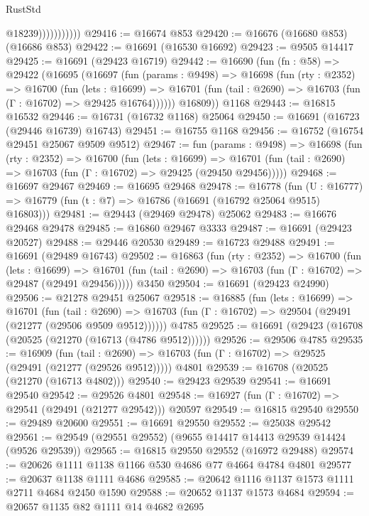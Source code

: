 \begin{lexlean}{RustStd}
\begin{coremodule}
                          @18239)))))))))))
@29416 := @16674 @853
@29420 := @16676 (@16680 @853) (@16686 @853)
@29422 := @16691 (@16530 @16692)
@29423 := @9505 @14417
@29425 := @16691 (@29423 @16719)
@29442 := @16690
    (fun (fn : @58) =>
    @29422
      (@16695
        (@16697
          (fun (params : @9498) =>
          @16698
            (fun (rty : @2352) =>
            @16700
              (fun (lets : @16699) =>
              @16701 (fun (tail : @2690) => @16703 (fun (Γ : @16702) => @29425 @16764))))))
        @16809))
    @1168
@29443 := @16815 @16532
@29446 := @16731 (@16732 @1168) @25064
@29450 := @16691 (@16723 (@29446 @16739) @16743)
@29451 := @16755 @1168
@29456 := @16752 (@16754 @29451 @25067 @9509 @9512)
@29467 := fun (params : @9498) =>
  @16698
    (fun (rty : @2352) =>
    @16700
      (fun (lets : @16699) =>
      @16701 (fun (tail : @2690) => @16703 (fun (Γ : @16702) => @29425 (@29450 @29456)))))
@29468 := @16697 @29467
@29469 := @16695 @29468
@29478 := @16778
    (fun (U : @16777) => @16779 (fun (t : @7) => @16786 (@16691 (@16792 @25064 @9515) @16803)))
@29481 := @29443 (@29469 @29478) @25062
@29483 := @16676 @29468 @29478
@29485 := @16860 @29467 @3333
@29487 := @16691 (@29423 @20527)
@29488 := @29446 @20530
@29489 := @16723 @29488
@29491 := @16691 (@29489 @16743)
@29502 := @16863
    (fun (rty : @2352) =>
    @16700
      (fun (lets : @16699) =>
      @16701 (fun (tail : @2690) => @16703 (fun (Γ : @16702) => @29487 (@29491 @29456)))))
    @3450
@29504 := @16691 (@29423 @24990)
@29506 := @21278 @29451 @25067
@29518 := @16885
    (fun (lets : @16699) =>
    @16701
      (fun (tail : @2690) =>
      @16703 (fun (Γ : @16702) => @29504 (@29491 (@21277 (@29506 @9509 @9512))))))
    @4785
@29525 := @16691 (@29423 (@16708 (@20525 (@21270 (@16713 (@4786 @9512))))))
@29526 := @29506 @4785
@29535 := @16909
    (fun (tail : @2690) => @16703 (fun (Γ : @16702) => @29525 (@29491 (@21277 (@29526 @9512)))))
    @4801
@29539 := @16708 (@20525 (@21270 (@16713 @4802)))
@29540 := @29423 @29539
@29541 := @16691 @29540
@29542 := @29526 @4801
@29548 := @16927 (fun (Γ : @16702) => @29541 (@29491 (@21277 @29542))) @20597
@29549 := @16815 @29540
@29550 := @29489 @20600
@29551 := @16691 @29550
@29552 := @25038 @29542
@29561 := @29549 (@29551 @29552) (@9655 @14417 @14413 @29539 @14424 (@9526 @29539))
@29565 := @16815 @29550 @29552 (@16972 @29488)
@29574 := @20626 @1111 @1138 @1166 @530 @4686 @77 @4664 @4784 @4801
@29577 := @20637 @1138 @1111 @4686
@29585 := @20642 @1116 @1137 @1573 @1111 @2711 @4684 @2450 @1590
@29588 := @20652 @1137 @1573 @4684
@29594 := @20657 @1135 @82 @1111 @14 @4682 @2695

\end{coremodule}
\end{lexlean}
